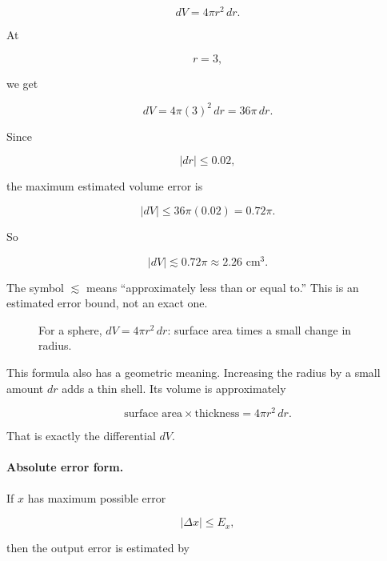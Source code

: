 \[
dV=4\pi r^2\,dr.
\]

At

\[
r=3,
\]

we get

\[
dV=4\pi(3)^2\,dr=36\pi\,dr.
\]

Since

\[
|dr|\le0.02,
\]

the maximum estimated volume error is

\[
|dV|
\le
36\pi(0.02)
=
0.72\pi.
\]

So

\[
\boxed{
|dV|\lesssim 0.72\pi\approx 2.26\text{ cm}^3.
}
\]

The symbol \(\lesssim\) means ``approximately less than or equal to.''  This is an
estimated error bound, not an exact one.

\begin{figure}[h]
\centering
{}
\caption{For a sphere, \(dV=4\pi r^2\,dr\): surface area times a small change in radius.}
\label{fig:sphere-shell-differential}
\end{figure}

This formula also has a geometric meaning.  Increasing the radius by a small amount
\(dr\) adds a thin shell.  Its volume is approximately

\[
\text{surface area}\times\text{thickness}
=
4\pi r^2\,dr.
\]

That is exactly the differential \(dV\).

\paragraph{Absolute error form.}
If \(x\) has maximum possible error

\[
|\Delta x|\le E_x,
\]

then the output error is estimated by

